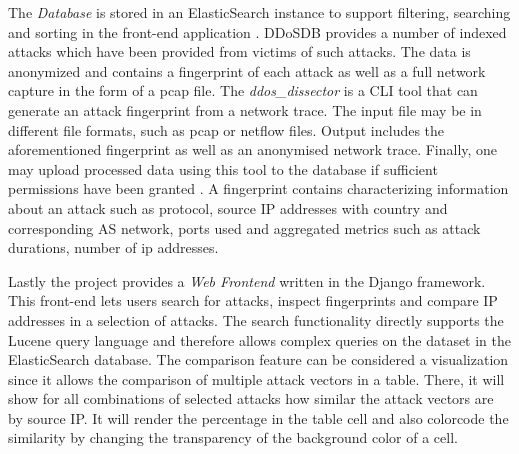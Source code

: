 The \emph{Database} is stored in an ElasticSearch instance to support filtering, searching and sorting in the front-end application \cite{ddosdb-help}.
DDoSDB provides a number of indexed attacks which have been provided from victims of such attacks. The data is anonymized and contains a fingerprint of each attack as well as a full network capture in the form of a pcap file. \cite{ddos_dissector}
The \emph{ddos\_dissector} is a CLI tool that can generate an attack fingerprint from a network trace. The input file may be in different file formats, such as pcap or netflow files.
Output includes the aforementioned fingerprint as well as an anonymised network trace. Finally, one may upload processed data using this tool to the database if sufficient permissions have been granted \cite{ddos_dissector}.
A fingerprint contains characterizing information about an attack such as protocol, source IP addresses with country and corresponding AS network, ports used and aggregated metrics such as attack durations, number of ip addresses\cite{ddosdb}.

Lastly the project provides a \emph{Web Frontend} written in the Django framework. This front-end lets users search for attacks, inspect fingerprints and compare IP addresses in a selection of attacks.
The search functionality directly supports the Lucene query language and therefore allows complex queries on the dataset in the ElasticSearch database.
The comparison feature can be considered a visualization since it allows the comparison of multiple attack vectors in a table. There, it will show for all combinations of selected attacks how similar the attack vectors are by source IP. It will render the percentage in the table cell and also colorcode the similarity by changing the transparency of the background color of a cell\cite{ddosdb}.

